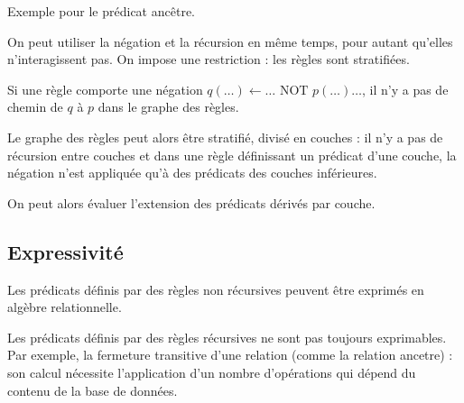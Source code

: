 		\pagebreak
		Exemple pour le prédicat ancêtre.
		
		
		On peut utiliser la négation et la récursion en même temps, pour autant qu'elles n'interagissent pas. On impose une restriction : les règles sont stratifiées.
		
		Si une règle comporte une négation $q(\dots) \leftarrow \dots \text{ NOT } p(\dots) \dots$, il n'y a pas de chemin de $q$ à $p$ dans le graphe des règles.
		
		Le graphe des règles peut alors être stratifié, divisé en couches : il n'y a pas de récursion entre couches et dans une règle définissant un prédicat d'une couche, la négation n'est appliquée qu'à des prédicats des couches inférieures.
		
		On peut alors évaluer l'extension des prédicats dérivés par couche.
		
		\subsection{Expressivité}
		
		Les prédicats définis par des règles non récursives peuvent être exprimés en algèbre relationnelle.
		
		Les prédicats définis par des règles récursives ne sont pas toujours exprimables. Par exemple, la fermeture transitive d'une relation (comme la relation ancetre) : son calcul nécessite l'application d'un nombre d'opérations qui dépend du contenu de la base de données.